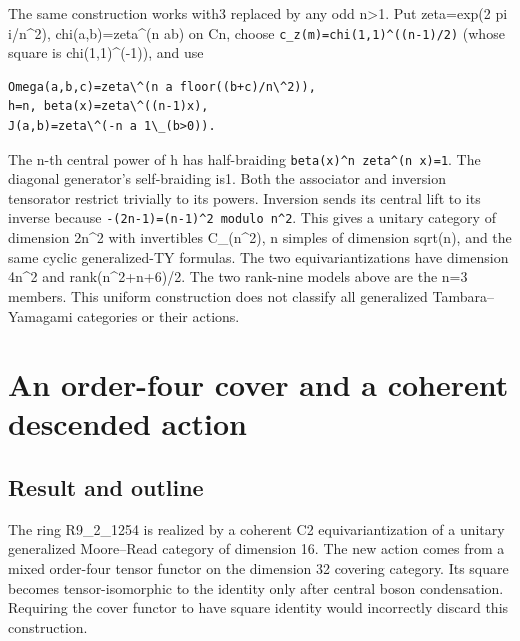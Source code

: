The same construction works with3 replaced by any odd n\textgreater1.
Put zeta=exp(2 pi i/n\^{}2), chi(a,b)=zeta\^{}(n ab) on Cn, choose
\texttt{c\_\allowbreak{}z(m)=c\allowbreak{}hi(1,1\allowbreak{})\textasciicircum{}((n-\allowbreak{}1)/\allowbreak{}2)}
(whose square is chi(1,1)\^{}(-1)), and use

\begin{verbatim}
Omega(a,b,c)=zeta\^(n a floor((b+c)/n\^2)),
h=n, beta(x)=zeta\^((n-1)x),
J(a,b)=zeta\^(-n a 1\_(b>0)).
\end{verbatim}

The n-th central power of h has half-braiding
\texttt{beta(x\allowbreak{})\textasciicircum{}n ze\allowbreak{}ta\textasciicircum{}(n \allowbreak{}x)=1}.
The diagonal generator's self-braiding is1. Both the associator and
inversion tensorator restrict trivially to its powers. Inversion sends
its central lift to its inverse because
\texttt{-\allowbreak{}(2n-\allowbreak{}1)=(n-\allowbreak{}1)\textasciicircum{}2 m\allowbreak{}odulo \allowbreak{}n\textasciicircum{}2}.
This gives a unitary category of dimension 2n\^{}2 with invertibles
C\_(n\^{}2), n simples of dimension sqrt(n), and the same cyclic
generalized-TY formulas. The two equivariantizations have dimension
4n\^{}2 and rank(n\^{}2+n+6)/2. The two rank-nine models above are the
n=3 members. This uniform construction does not classify all generalized
Tambara--Yamagami categories or their actions.

\hypertarget{an-order-four-cover-and-a-coherent-descended-action}{%
\section{An order-four cover and a coherent descended
action}\label{an-order-four-cover-and-a-coherent-descended-action}}

\hypertarget{result-and-outline}{%
\subsection{Result and outline}\label{result-and-outline}}

The ring R9\_2\_1254 is realized by a coherent C2 equivariantization of
a unitary generalized Moore--Read category of dimension 16. The new
action comes from a mixed order-four tensor functor on the dimension 32
covering category. Its square becomes tensor-isomorphic to the identity
only after central boson condensation. Requiring the cover functor to
have square identity would incorrectly discard this construction.

